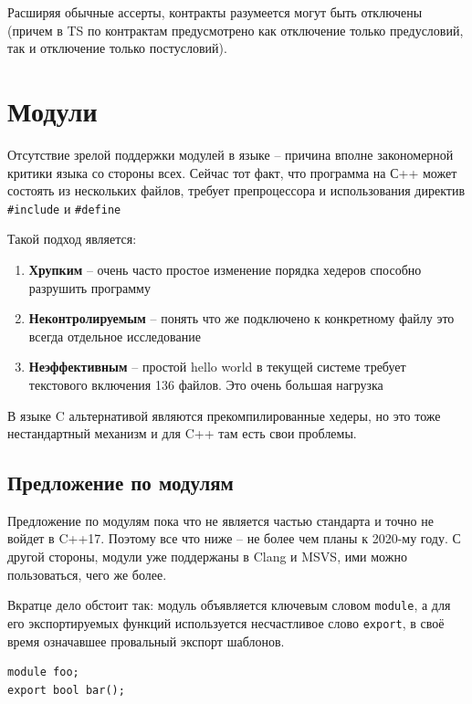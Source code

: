 \documentclass[a4paper,12pt,oneside]{book}
\newif\ifmodules
\begin{document}
Расширяя обычные ассерты, контракты разумеется могут быть отключены (причем в TS по контрактам предусмотрено как отключение только предусловий, так и отключение только постусловий).

\ifmodules
\pagebreak
\section{Модули}\label{NewModules}

Отсутствие зрелой поддержки модулей в языке -- причина вполне закономерной критики языка со стороны всех. Сейчас тот факт, что программа на С++ может состоять из нескольких файлов, требует препроцессора и использования директив \lstinline!#include! и \lstinline!#define!

Такой подход является:

\begin{enumerate}
\item \textbf{Хрупким} -- очень часто простое изменение порядка хедеров способно разрушить программу
\item \textbf{Неконтролируемым} -- понять что же подключено к конкретному файлу это всегда отдельное исследование
\item \textbf{Неэффективным} -- простой hello world в текущей системе требует текстового включения 136 файлов. Это очень большая нагрузка
\end{enumerate}

В языке C альтернативой являются прекомпилированные хедеры, но это тоже нестандартный механизм и для C++ там есть свои проблемы.

\subsection{Предложение по модулям}

Предложение по модулям пока что не является частью стандарта и точно не войдет в C++17. Поэтому все что ниже -- не более чем планы к 2020-му году. С другой стороны, модули уже поддержаны в Clang и MSVS, ими можно пользоваться, чего же более.

Вкратце дело обстоит так: модуль объявляется ключевым словом \lstinline!module!, а для его экспортируемых функций используется несчастливое слово \lstinline!export!, в своё время означавшее провальный экспорт шаблонов.

\begin{lstlisting}
module foo;
export bool bar(); 
\end{lstlisting}
\end{document}
